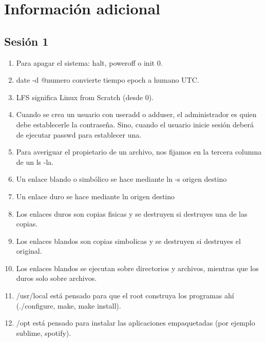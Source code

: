 \chapter{Información adicional}

\section{Sesión 1}
\begin{enumerate}
    \item Para apagar el sistema: halt, poweroff o init 0.
    \item date -d @numero convierte tiempo epoch a humano UTC.
    \item LFS significa Linux from Scratch (desde 0).
    \item Cuando se crea un usuario con useradd o adduser, el administrador es quien debe establecerle la contraseña. Sino, cuando el usuario inicie sesión deberá de ejecutar passwd para establecer una.
    \item Para averiguar el propietario de un archivo, nos fijamos en la tercera columna de un ls -la.
    \item Un enlace blando o simbólico se hace mediante ln -s  origen destino
    \item Un enlace duro se hace mediante ln origen destino
    \item Los enlaces duros son copias fisicas y se destruyen si destruyes una de las copias.
    \item Los enlaces blandos son copias simbolicas y se destruyen si destruyes el original.
    \item Los enlaces blandos se ejecutan sobre directorios y archivos, mientras que los duros solo sobre archivos.
    \item /usr/local está pensado para que el root construya los programas ahí (./configure, make, make install).
    \item /opt está pensado para instalar las aplicaciones empaquetadas (por ejemplo sublime, spotify).
\end{enumerate}


